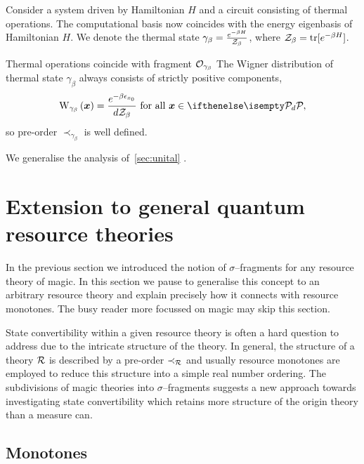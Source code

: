 \documentclass[pra,
aps,
twocolumn,
superscriptaddress,
groupedaddress,
nofootinbib,
reprint
]{revtex4-1}
\begin{document}
Consider a system driven by Hamiltonian $H$ and a circuit consisting of thermal operations.
The computational basis now coincides with the energy eigenbasis of Hamiltonian $H$.
We denote the thermal state $\gamma_\beta = \frac{e^{-\beta H}}{\mathcal{Z}_\beta}$, where $\mathcal{Z}_\beta = {\rm{tr}}[e^{-\beta H}]$.

Thermal operations coincide with fragment $\mathcal{O}_{\gamma_\beta}$ 
The Wigner distribution of thermal state $\gamma_\beta$ always consists of strictly positive components,
\begin{equation}
	\W[\bmx]{\gamma_\beta} = \frac{e^{-\beta \epsilon_{x_0}}}{d\Z_\beta}\ \text{for all}\ \bmx \in \pd,
\end{equation}
so pre-order $\prec_{\gamma_\beta}$ is well defined.

We generalise the analysis of~\cref{sec:unital} .

\section{Extension to general quantum resource theories}
\label{sec:frag}

In the previous section we introduced the notion of $\sigma$--fragments for any resource theory of magic. In this section we pause to generalise this concept to an arbitrary resource theory and explain precisely how it connects with resource monotones. The busy reader more focussed on magic may skip this section.

State convertibility within a given resource theory is often a hard question to address due to the intricate structure of the theory.
In general, the structure of a theory $\mathcal{R}$ is described by a pre-order $\prec_{\mathcal{R}}$ and usually resource monotones are employed to reduce this structure into a simple real number ordering.
The subdivisions of magic theories into $\sigma$--fragments suggests a new approach towards investigating state convertibility which retains more structure of the origin theory than a measure can.

\subsection{Monotones}\label{sec:mono}
\end{document}
